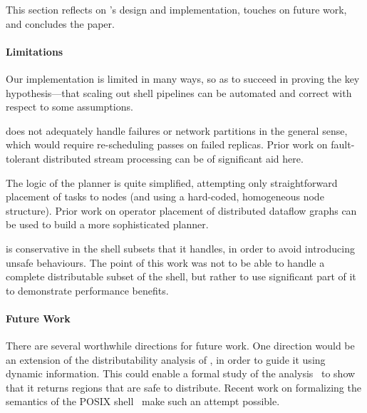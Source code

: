 \documentclass[letterpaper,twocolumn,10pt]{article}
\begin{document}
This section reflects on \sys's design and implementation, touches on future work, and concludes the paper.

\paragraph{Limitations}
Our implementation is limited in many ways, so as to succeed in proving the key hypothesis---that scaling out shell pipelines can be automated and correct with respect to some assumptions.

\sys does not adequately handle failures or network partitions in the general sense, which would require re-scheduling passes on failed replicas.
Prior work on fault-tolerant distributed stream processing can be of significant aid here.

The logic of the planner is quite simplified, attempting only straightforward placement of tasks to nodes (and using a hard-coded, homogeneous node structure).
Prior work on operator placement of distributed dataflow graphs can be used to build a more sophisticated planner.

\sys is conservative in the shell subsets that it handles, in order to
avoid introducing unsafe behaviours. The point of this work was not to be
able to handle a complete distributable subset of the shell, but
rather to use significant part of it to demonstrate performance benefits.



\paragraph{Future Work}
There are several worthwhile directions for future work.  One
direction would be an extension of the distributability analysis of
\sys, in order to guide it using dynamic information. This could
enable a formal study of the analysis~ to show that it
returns regions that are safe to distribute.  Recent work on
formalizing the semantics of the POSIX shell~\cite{smoosh:20} make
such an attempt possible.
\end{document}
